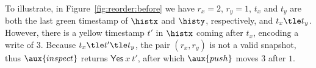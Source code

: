 %
To illustrate, in Figure~\ref{fig:reorder:before} we have $r_x = 2$,
$r_y = 1$, $t_x$ and $t_y$ are both the last green timestamp of
$\histx$ and $\histy$, respectively, and $t_x \tle t_y$. However,
there is a yellow timestamp $t'$ in $\histx$ coming after $t_x$,
encoding a write of $3$. Because $t_x \tle t' \tle t_y$, the pair
$(r_x, r_y)$ is not a valid snapshot, thus $\aux{inspect}$ returns
$\mathsf{Yes}\ x\ t'$, after which $\aux{push}$ moves $3$ after $1$.

%


